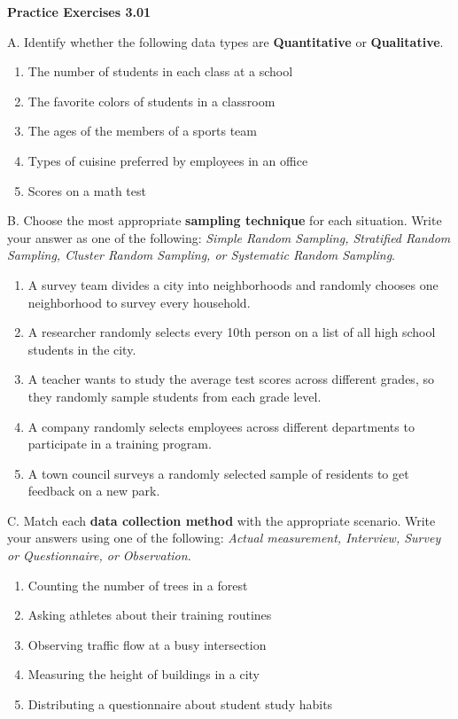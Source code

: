 \vspace{0.3ex}
\noindent\textbf{Practice Exercises 3.01}

\vspace{0.2ex}


\noindent A. Identify whether the following data types are \textbf{Quantitative} or \textbf{Qualitative}.
\begin{enumerate}[label=\color{blue}\arabic*. , noitemsep]
    \item The number of students in each class at a school
    \item The favorite colors of students in a classroom
    \item The ages of the members of a sports team
    \item Types of cuisine preferred by employees in an office
    \item Scores on a math test
\end{enumerate}

\noindent B. Choose the most appropriate \textbf{sampling technique} for each situation. Write your answer as one of the following: \textit{Simple Random Sampling, Stratified Random Sampling, Cluster Random Sampling, or Systematic Random Sampling}.
\begin{enumerate}[label=\color{blue}\arabic*. , noitemsep]
    \item A survey team divides a city into neighborhoods and randomly chooses one neighborhood to survey every household.
    \item A researcher randomly selects every 10th person on a list of all high school students in the city.
    \item A teacher wants to study the average test scores across different grades, so they randomly sample students from each grade level.
    \item A company randomly selects employees across different departments to participate in a training program.
    \item A town council surveys a randomly selected sample of residents to get feedback on a new park.
\end{enumerate}

\noindent C. Match each \textbf{data collection method} with the appropriate scenario. Write your answers using one of the following: \textit{Actual measurement, Interview, Survey or Questionnaire, or Observation}.
\begin{enumerate}[label=\color{blue}\arabic*. , noitemsep]
    \item Counting the number of trees in a forest
    \item Asking athletes about their training routines
    \item Observing traffic flow at a busy intersection
    \item Measuring the height of buildings in a city
    \item Distributing a questionnaire about student study habits
\end{enumerate}

